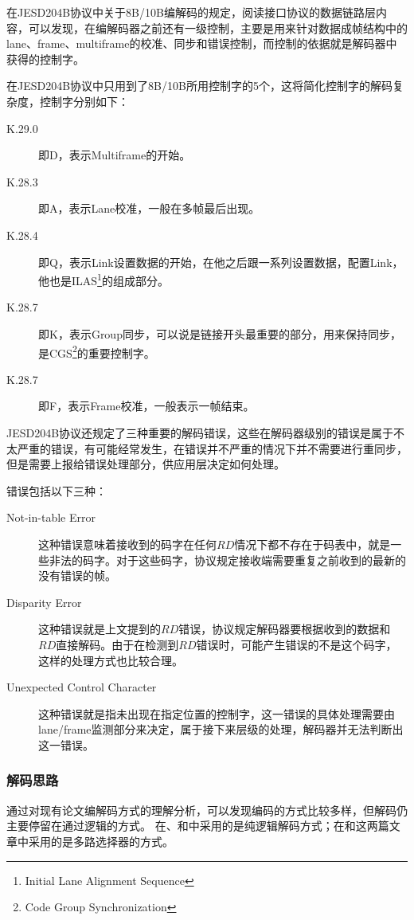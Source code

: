 \documentclass[UTF8]{ctexart}
\begin{document}
在JESD204B协议中关于8B/10B编解码的规定，阅读接口协议的数据链路层内容，可以发现，在编解码器之前还有一级控制，主要是用来针对数据成帧结构中的lane、frame、multiframe的校准、同步和错误控制，而控制的依据就是解码器中获得的控制字。

在JESD204B协议中只用到了8B/10B所用控制字的5个，这将简化控制字的解码复杂度，控制字分别如下：

\begin{description}
\item[K.29.0] 即D，表示Multiframe的开始。
\item[K.28.3] 即A，表示Lane校准，一般在多帧最后出现。
\item[K.28.4] 即Q，表示Link设置数据的开始，在他之后跟一系列设置数据，配置Link，他也是ILAS\footnote{Initial Lane Alignment Sequence}的组成部分。
\item[K.28.7] 即K，表示Group同步，可以说是链接开头最重要的部分，用来保持同步，是CGS\footnote{Code Group Synchronization}的重要控制字。
\item[K.28.7] 即F，表示Frame校准，一般表示一帧结束。
\end{description}

JESD204B协议还规定了三种重要的解码错误，这些在解码器级别的错误是属于不太严重的错误，有可能经常发生，在错误并不严重的情况下并不需要进行重同步，但是需要上报给错误处理部分，供应用层决定如何处理。

错误包括以下三种：

\begin{description}
\item[Not-in-table Error] 这种错误意味着接收到的码字在任何$RD$情况下都不存在于码表中，就是一些非法的码字。对于这些码字，协议规定接收端需要重复之前收到的最新的没有错误的帧。
\item[Disparity Error] 这种错误就是上文提到的$RD$错误，协议规定解码器要根据收到的数据和$RD$直接解码。由于在检测到$RD$错误时，可能产生错误的不是这个码字，这样的处理方式也比较合理。
\item[Unexpected Control Character] 这种错误就是指未出现在指定位置的控制字，这一错误的具体处理需要由lane/frame监测部分来决定，属于接下来层级的处理，解码器并无法判断出这一错误。
\end{description}

\subsubsection{解码思路}

通过对现有论文编解码方式的理解分析，可以发现编码的方式比较多样，但解码仍主要停留在通过逻辑的方式。
在\cite{zhaoyh2003}、\cite{hecf2005}和\cite{Widmer1983}中采用的是纯逻辑解码方式；在\cite{wenl2007}和\cite{Actel1998}这两篇文章中采用的是多路选择器的方式。
\end{document}

